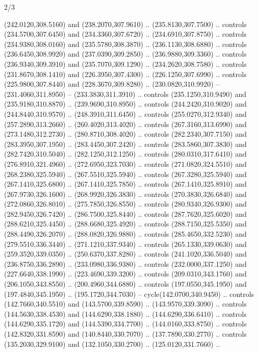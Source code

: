 \begin{flagdescription}{2/3}
\begin{scope}[xshift=0.5\flaglength,yshift=0.5\flagwidth,scale=\stretchfactor]
\begin{scope}[scale=0.001645\flagwidth,yshift=65mm,xshift=-63mm]
\begin{scope}[y=0.80pt, x=0.80pt, yscale=-1,]
\begin{scope}[cm={{1.33333,0.0,0.0,1.33333,(0.0,1e-05)}}]
  (242.0120,308.5160) and (238.2070,307.9610) .. (235.8130,307.7500) .. controls
  (234.5700,307.6450) and (234.3360,307.6720) .. (234.6910,307.8750) .. controls
  (234.9380,308.0160) and (235.5780,308.3870) .. (236.1130,308.6880) .. controls
  (236.6450,308.9920) and (237.0390,309.2850) .. (236.9880,309.3360) .. controls
  (236.9340,309.3910) and (235.7070,309.1290) .. (234.2620,308.7580) .. controls
  (231.8670,308.1410) and (226.3950,307.4300) .. (226.1250,307.6990) .. controls
  (225.9800,307.8440) and (228.3670,309.8280) .. (230.0820,310.9920) --
  (231.4060,311.8950) -- (233.3830,311.3910) .. controls (235.1250,310.9490) and
  (235.9180,310.8870) .. (239.9690,310.8950) .. controls (244.2420,310.9020) and
  (244.8440,310.9570) .. (248.3910,311.6450) .. controls (255.0270,312.9340) and
  (257.2890,313.2660) .. (260.4020,313.4020) .. controls (267.3160,313.6990) and
  (273.1480,312.2730) .. (280.8710,308.4020) .. controls (282.2340,307.7150) and
  (283.3950,307.1950) .. (283.4450,307.2420) .. controls (283.5860,307.3830) and
  (282.7420,310.5040) .. (282.1250,312.1250) .. controls (280.0310,317.6410) and
  (276.8910,321.4960) .. (272.6950,323.7030) .. controls (271.0820,324.5510) and
  (268.2380,325.5940) .. (267.5510,325.5940) .. controls (267.3280,325.5940) and
  (267.1410,325.6800) .. (267.1410,325.7850) .. controls (267.1410,325.8910) and
  (267.9730,326.1600) .. (268.9920,326.3830) .. controls (270.3830,326.6840) and
  (272.0860,326.8010) .. (275.7850,326.8550) .. controls (280.9340,326.9300) and
  (282.9450,326.7420) .. (286.7500,325.8440) .. controls (287.7620,325.6020) and
  (288.6210,325.4450) .. (288.6680,325.4920) .. controls (288.7150,325.5350) and
  (288.4490,326.2070) .. (288.0820,326.9880) .. controls (285.4650,332.5230) and
  (279.5510,336.3440) .. (271.1210,337.9340) .. controls (265.1330,339.0630) and
  (259.3520,339.0350) .. (250.6370,337.8280) .. controls (241.1020,336.5040) and
  (236.8750,336.2890) .. (233.0980,336.9380) .. controls (232.0000,337.1250) and
  (227.6640,338.1990) .. (223.4690,339.3200) .. controls (209.0310,343.1760) and
  (206.1050,343.8550) .. (200.4960,344.6880) .. controls (197.0550,345.1950) and
  (197.4840,345.1950) .. (195.1720,344.7030) -- cycle(142.0700,340.9450) ..
  controls (142.7660,340.5510) and (143.5700,339.8590) .. (143.9570,339.3090) ..
  controls (144.5630,338.4530) and (144.6290,338.1880) .. (144.6290,336.6410) ..
  controls (144.6290,335.1720) and (144.5390,334.7700) .. (144.0160,333.8750) ..
  controls (142.8320,331.8590) and (140.8440,330.7070) .. (137.7890,330.2770) ..
  controls (135.2030,329.9100) and (132.1050,330.2700) .. (125.0120,331.7660) ..

\end{scope}
\end{scope}
\end{scope}
\end{scope}
\end{flagdescription}
